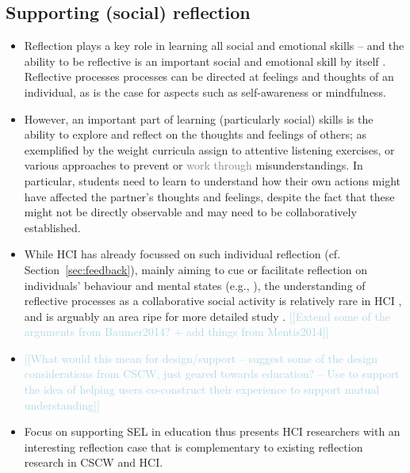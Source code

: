 \documentclass[prodmode,acmtochi]{acmsmall}
\newcommand{\todo}[1]{\textrm{\textrm{\textcolor{LightBlue}{[[#1]]} } } }
\newcommand{\rephrase}[1]{\textrm{\textrm{\textcolor{gray}{#1}}}}
\begin{document}
\subsection{Supporting (social) reflection}

\begin{itemize}
	\item 
Reflection plays a key role in learning all social and emotional skills -- and the ability to be reflective is an important social and emotional skill by itself \cite{Cohen2001,r,r}. Reflective processes processes can be directed at feelings and thoughts of an individual, as is the case for aspects such as self-awareness or mindfulness. 
		
		
\item However, an important part of learning (particularly social) skills is the ability to explore and reflect on the thoughts and feelings of others;  as exemplified by the weight curricula assign to attentive listening exercises, or various approaches to prevent or \rephrase{work through} misunderstandings.
%
In particular, students need to learn to understand how their own actions might have affected the partner’s thoughts and feelings, despite the fact that these might not be directly observable and may need to be collaboratively established.


\item While HCI has already focussed on such individual reflection (cf. Section~\ref{sec:feedback}), mainly aiming to cue or facilitate reflection on individuals' behaviour and mental states (e.g., \cite{Sas2011,Stahl2008,Thieme2011,Isaacs2013}), the understanding of reflective processes as a collaborative social activity is relatively rare in HCI \cite{Fleck2012,Prilla2012}, and is arguably an area ripe for more detailed study \cite{Baumer2014}. 
\todo{Extend some of the arguments from Baumer2014? + add things from Mentis2014}

\item \todo{What would this mean for design/support -- suggest some of the design considerations from CSCW, just geared towards education? -- Use \cite{Mentis2014} to support the idea of helping users co-construct their experience to support mutual understanding}

\item Focus on supporting SEL in education thus presents HCI researchers with an interesting reflection case that is complementary to  existing reflection research in CSCW and HCI.  


\end{itemize}
\end{document}
